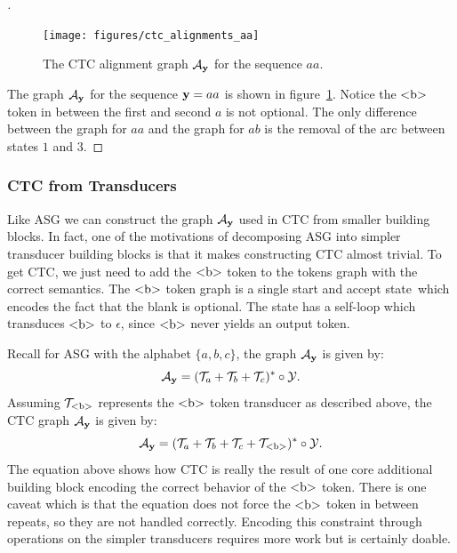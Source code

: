 \begin{proof}[\unskip\nopunct]

\begin{figure}
    \centering
    \texttt{[image: figures/ctc\_alignments\_aa]}
    \caption{The CTC alignment graph $\mathcal{A}_{\bf y}$ for the sequence $aa$.}
    \label{fig:ctc_alignments_aa}
\end{figure}

The graph $\mathcal{A}_{\bf y}$ for the sequence ${\bf y} = aa$ is shown in
figure~\ref{fig:ctc_alignments_aa}. Notice the $\textrm{\textless b\textgreater}$ token in between the
first and second $a$ is not optional. The only difference between the graph
for $aa$ and the graph for $ab$ is the removal of the arc between states
$1$ and $3$.
\end{proof}

\subsubsection{CTC from Transducers}

Like ASG we can construct the graph $\mathcal{A}_{\bf y}$ used in CTC from smaller building
blocks. In fact, one of the motivations of decomposing ASG into simpler
transducer building blocks is that it makes constructing CTC almost trivial.
To get CTC, we just need to add the $\textrm{\textless b\textgreater}$ token to the tokens graph with the
correct semantics. The $\textrm{\textless b\textgreater}$ token graph is a single start and accept
state which encodes the fact that the blank is optional. The state has a
self-loop which transduces $\textrm{\textless b\textgreater}$ to $\epsilon$, since $\textrm{\textless b\textgreater}$ never yields
an output token.

Recall for ASG with the alphabet $\{a, b, c\}$, the graph $\mathcal{A}_{\bf y}$ is given
by:
$$
\mathcal{A}_{\bf y} = (\mathcal{T}_a + \mathcal{T}_b + \mathcal{T}_c)^* \circ \mathcal{Y}.
$$
Assuming $\mathcal{T}_{\textrm{\textless b\textgreater}}$ represents the $\textrm{\textless b\textgreater}$ token transducer as described
above, the CTC graph $\mathcal{A}_{\bf y}$ is given by:
$$
\mathcal{A}_{\bf y} = (\mathcal{T}_a + \mathcal{T}_b + \mathcal{T}_c + \mathcal{T}_{\textrm{\textless b\textgreater}})^* \circ \mathcal{Y}.
$$
The equation above shows how CTC is really the result of one core additional
building block encoding the correct behavior of the $\textrm{\textless b\textgreater}$ token. There is
one caveat which is that the equation does not force the $\textrm{\textless b\textgreater}$ token
in between repeats, so they are not handled correctly. Encoding this constraint
through operations on the simpler transducers requires more work but is
certainly doable.
